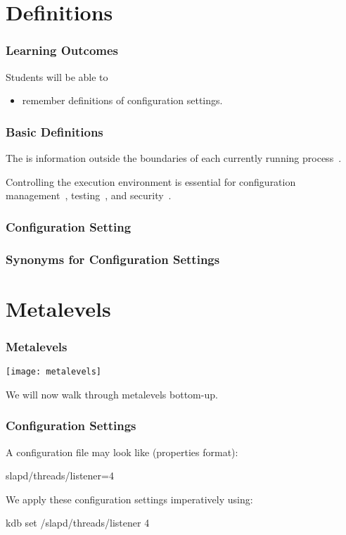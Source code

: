 \section{Definitions}

\begin{frame}
	\frametitle{Learning Outcomes}
	Students will be able to
	\begin{itemize}
	\item remember definitions of configuration settings.
	\end{itemize}
\end{frame}

\begin{frame}
	\frametitle{Basic Definitions}
	The  is information outside the boundaries of each currently running process~\cite{corbato1971multics}.

	Controlling the execution environment is essential for configuration management~\cite{cons2002pan,huang2015confvalley}, testing~\cite{van2010automating,wang2009context}, and security~\cite{goldberg1996secure,schreuders2012towards,perkins2009automatically,liang2003isolated}.
\end{frame}

\begin{frame}
	\frametitle{Configuration Setting}
	
\end{frame}

\begin{frame}[fragile]
	\frametitle{Synonyms for Configuration Settings}
\end{frame}




\section{Metalevels}

\begin{frame}
	\frametitle{Metalevels}
	\texttt{[image: metalevels]}

	We will now walk through metalevels bottom-up.
\end{frame}

\begin{frame}[fragile]
	\frametitle{Configuration Settings}

	A configuration file may look like (properties format):

	\begin{code}[language=CfgElektra]
	slapd/threads/listener=4
	\end{code}

	\vspace{1cm}

	We apply these configuration settings imperatively using:

	\begin{code}[language=bash]
	kdb set /slapd/threads/listener 4
	\end{code}
\end{frame}

